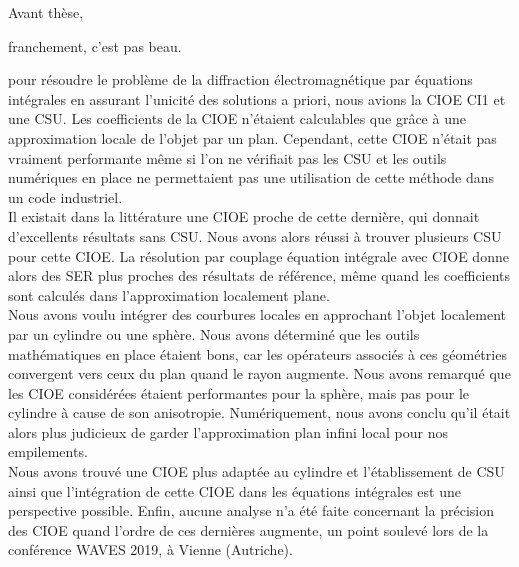 
Avant thèse,
\begin{REM}
  franchement, c'est pas beau.
\end{REM} 
 pour résoudre le problème de la diffraction électromagnétique par équations intégrales en assurant l'unicité des solutions a priori, nous avions la CIOE CI1 et une CSU.
Les coefficients de la CIOE n'étaient calculables que grâce à une approximation locale de l'objet par un plan.
Cependant, cette CIOE n'était pas vraiment performante même si l’on ne vérifiait pas les CSU et les outils numériques en place ne permettaient pas une utilisation de cette méthode dans un code industriel.
\\

Il existait dans la littérature une CIOE proche de cette dernière, qui donnait d'excellents résultats sans CSU.
Nous avons alors réussi à trouver plusieurs CSU pour cette CIOE.
La résolution par couplage équation intégrale avec CIOE donne alors des SER plus proches des résultats de référence, même quand les coefficients sont calculés dans l'approximation localement plane.
\\

Nous avons voulu intégrer des courbures locales en approchant l'objet localement par un cylindre ou une sphère.
Nous avons déterminé que les outils mathématiques en place étaient bons, car les opérateurs associés à ces géométries convergent vers ceux du plan quand le rayon augmente.
Nous avons remarqué que les CIOE considérées étaient performantes pour la sphère, mais pas pour le cylindre à cause de son anisotropie.
Numériquement, nous avons conclu qu'il était alors plus judicieux de garder l’approximation plan infini local pour nos empilements.
\\

Nous avons trouvé une CIOE plus adaptée au cylindre et l'établissement de CSU ainsi que l'intégration de cette CIOE dans les équations intégrales est une perspective possible.
Enfin, aucune analyse n'a été faite concernant la précision des CIOE quand l'ordre de ces dernières augmente, un point soulevé lors de la conférence WAVES 2019, à Vienne (Autriche).

